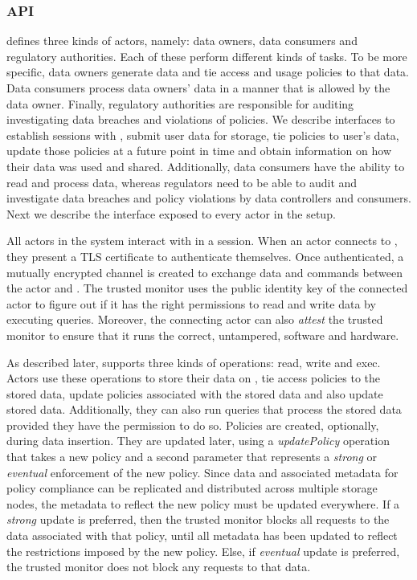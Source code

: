 \subsubsection{\project{} API}

\project{} defines three kinds of actors, namely: data owners, data consumers and regulatory authorities. Each of these perform different kinds of tasks. To be more specific, data owners generate data and tie access and usage policies to that data. Data consumers process data owners' data in a manner that is allowed by the data owner. Finally, regulatory authorities are responsible for auditing investigating data breaches and violations of policies. We describe interfaces to establish sessions with \project{}, submit user data for storage, tie policies to user's data, update those policies at a future point in time and obtain information on how their data was used and shared. Additionally, data consumers have the ability to read and process data, whereas regulators need to be able to audit and investigate data breaches and policy violations by data controllers and consumers. Next we describe the interface exposed to every actor in the setup.

All actors in the system interact with \project{} in a session. When an actor connects to \project{}, they present a TLS certificate to authenticate themselves. Once authenticated, a mutually encrypted channel is created to exchange data and commands between the actor and \project{}. The trusted monitor uses the public identity key of the connected actor to figure out if it has the right permissions to read and write data by executing queries. Moreover, the connecting actor can also \emph{attest} the trusted monitor to ensure that it runs the correct, untampered, software and hardware.

As described later, \project{} supports three kinds of operations: read, write and exec. Actors use these operations to store their data on \project{}, tie access policies to the stored data, update policies associated with the stored data and also update stored data. Additionally, they can also run queries that process the stored data provided they have the permission to do so. Policies are created, optionally, during data insertion. They are updated later, using a \emph{updatePolicy} operation that takes a new policy and a second parameter that represents a \emph{strong} or \emph{eventual} enforcement of the new policy. Since data and associated metadata for policy compliance can be replicated and distributed across multiple storage nodes, the metadata to reflect the new policy must be updated everywhere. If a \emph{strong} update is preferred, then the trusted monitor blocks all requests to the data associated with that policy, until all metadata has been updated to reflect the restrictions imposed by the new policy. Else, if \emph{eventual} update is preferred, the trusted monitor does not block any requests to that data.

